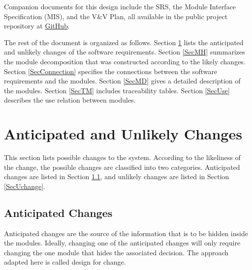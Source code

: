 \documentclass[12pt, titlepage]{article}
\begin{document}
Companion documents for this design include the SRS, the Module Interface
Specification (MIS), and the V\&V Plan, all available in the public project
repository at \href{https://github.com/gkpodder/Proxi}{GitHub}.

The rest of the document is organized as follows. Section \ref{SecChange} lists
the anticipated and unlikely changes of the software requirements. Section
\ref{SecMH} summarizes the module decomposition that was constructed according
to the likely changes. Section \ref{SecConnection} specifies the connections
between the software requirements and the modules. Section \ref{SecMD} gives a
detailed description of the modules. Section \ref{SecTM} includes traceability
tables. Section \ref{SecUse} describes the use relation between modules.

\section{Anticipated and Unlikely Changes} \label{SecChange}

This section lists possible changes to the system. According to the likeliness
of the change, the possible changes are classified into two categories.
Anticipated changes are listed in Section \ref{SecAchange}, and unlikely
changes are listed in Section \ref{SecUchange}.

\subsection{Anticipated Changes} \label{SecAchange}

Anticipated changes are the source of the information that is to be hidden
inside the modules. Ideally, changing one of the anticipated changes will only
require changing the one module that hides the associated decision. The
approach adapted here is called design for change.
\end{document}
